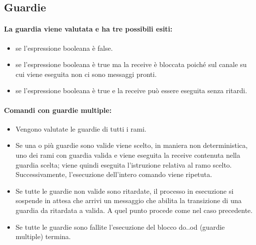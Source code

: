 

\subsection{Guardie}


\paragraph{La guardia viene valutata e ha tre possibili esiti:}

\begin{itemize}
	\item {} se l'espressione booleana è false.
	\item {} se l'espressione booleana è true ma la receive è bloccata poiché sul canale su cui viene eseguita non ci sono messaggi pronti.
	\item {} se l'espressione booleana è true e la receive può essere eseguita senza ritardi.
\end{itemize}

\paragraph{Comandi con guardie multiple:}

\begin{itemize}
	\item Vengono valutate le guardie di tutti i rami.
	\item Se una o più guardie sono valide viene scelto, in maniera non deterministica,
	      uno dei rami con guardia valida e viene eseguita la receive contenuta nella
	      guardia scelta; viene quindi eseguita l’istruzione relativa al ramo scelto.
	      Successivamente, l’esecuzione dell’intero comando viene ripetuta.
	\item Se tutte le guardie non valide sono ritardate, il processo in esecuzione si
	      sospende in attesa che arrivi un messaggio che abilita la transizione di una
	      guardia da ritardata a valida.
	      A quel punto procede come nel caso precedente.
	\item Se tutte le guardie sono fallite l’esecuzione del blocco do..od (guardie multiple) termina.
\end{itemize}

